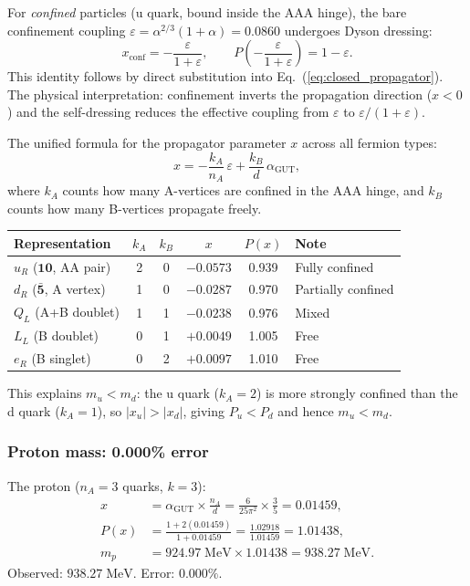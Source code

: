 \documentclass[12pt]{article}
\theoremstyle{remark}
\theoremstyle{definition}
\newcommand{\agut}{\alpha_{\mathrm{GUT}}}
\begin{document}
For \emph{confined} particles (u quark, bound inside the AAA hinge), the bare confinement coupling $\varepsilon = \alpha^{2/3}(1+\alpha) = 0.0860$ undergoes Dyson dressing:
\begin{equation}
\label{eq:dyson_dressing}
x_\mathrm{conf} = -\frac{\varepsilon}{1+\varepsilon}, \qquad P\!\left(-\frac{\varepsilon}{1+\varepsilon}\right) = 1 - \varepsilon.
\end{equation}
This identity follows by direct substitution into Eq.~(\ref{eq:closed_propagator}).  The physical interpretation: confinement inverts the propagation direction ($x < 0$) and the self-dressing reduces the effective coupling from $\varepsilon$ to $\varepsilon/(1+\varepsilon)$.

The unified formula for the propagator parameter $x$ across all fermion types:
\begin{equation}
x = -\frac{k_A}{n_A}\,\varepsilon + \frac{k_B}{d}\,\agut,
\end{equation}
where $k_A$ counts how many A-vertices are confined in the AAA hinge, and $k_B$ counts how many B-vertices propagate freely.

\begin{center}
\begin{tabular}{lccccl}
\hline
Representation & $k_A$ & $k_B$ & $x$ & $P(x)$ & Note \\
\hline
$u_R$ ($\mathbf{10}$, AA pair) & 2 & 0 & $-0.0573$ & 0.939 & Fully confined \\
$d_R$ ($\bar{\mathbf{5}}$, A vertex) & 1 & 0 & $-0.0287$ & 0.970 & Partially confined \\
$Q_L$ (A+B doublet) & 1 & 1 & $-0.0238$ & 0.976 & Mixed \\
$L_L$ (B doublet) & 0 & 1 & $+0.0049$ & 1.005 & Free \\
$e_R$ (B singlet) & 0 & 2 & $+0.0097$ & 1.010 & Free \\
\hline
\end{tabular}
\end{center}

This explains $m_u < m_d$: the u quark ($k_A = 2$) is more strongly confined than the d quark ($k_A = 1$), so $|x_u| > |x_d|$, giving $P_u < P_d$ and hence $m_u < m_d$.

\subsubsection{Proton mass: 0.000\% error}

The proton ($n_A = 3$ quarks, $k = 3$):
\begin{align}
x &= \agut \times \frac{n_A}{d} = \frac{6}{25\pi^2} \times \frac{3}{5} = 0.01459, \\
P(x) &= \frac{1 + 2(0.01459)}{1 + 0.01459} = \frac{1.02918}{1.01459} = 1.01438, \\
m_p &= 924.97\;\text{MeV} \times 1.01438 = 938.27\;\text{MeV}.
\end{align}
Observed: $938.27\;\text{MeV}$.  Error: $\mathbf{0.000\%}$.
\end{document}
